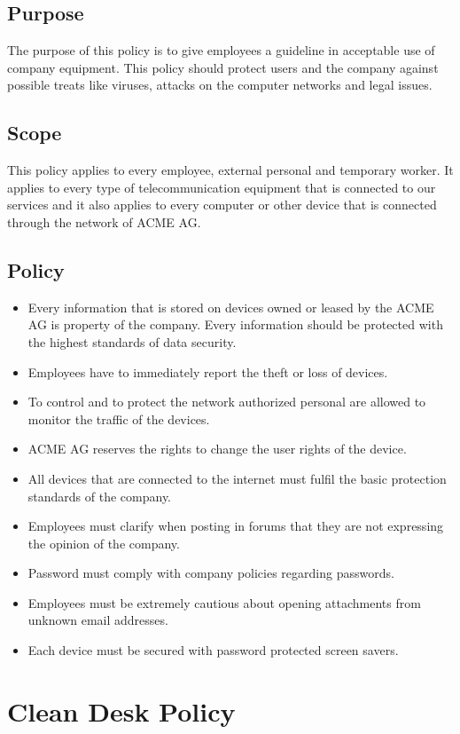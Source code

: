 \section{Purpose}
The purpose of this policy is to give employees a guideline in acceptable use of company equipment. This policy should protect users and the company against possible treats like viruses,  attacks on the computer networks and legal issues\cite{Sans}.
\section{Scope}
This policy applies to every employee, external personal and temporary worker. It applies to every type of telecommunication equipment that is connected to our services and it also applies to every computer or other device that is connected through the network of ACME AG.  
\section{Policy}
\begin{itemize}
\item Every information that is stored on devices owned or leased by the ACME AG is property of the company. Every information should be protected with the highest standards of data security.
\item Employees have to immediately report the  theft or loss of  devices.
\item To control and to protect the network authorized personal are allowed to monitor the traffic of the devices.
\item ACME AG reserves the rights to change the user rights of the device.
\item All devices that are connected to the internet must fulfil the basic protection standards of the company.
\item Employees must clarify when posting in forums that they are not expressing the opinion of the company. 
\item Password must comply with company policies regarding passwords.
\item Employees must be extremely cautious about opening attachments from unknown email addresses.
\item Each device must be secured with password protected screen savers.
\end{itemize}
\chapter{Clean Desk Policy}
